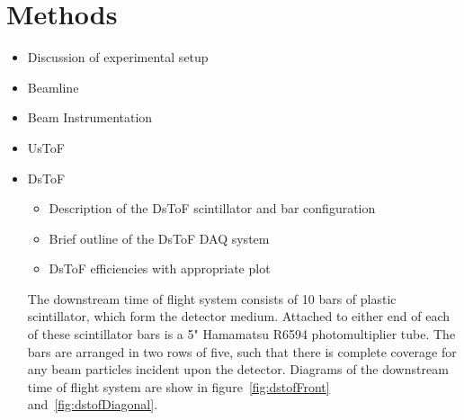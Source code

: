 \section{Methods}
\label{hptpcPaper:sec:Methods}
\begin{itemize}
    \item Discussion of experimental setup
\item Beamline
\item Beam Instrumentation
\item UsToF
\item DsToF
    \begin{itemize}
        \item Description of the DsToF scintillator and bar configuration 
        \item Brief outline of the DsToF DAQ system
        \item DsToF efficiencies with appropriate plot
    \end{itemize}
    The downstream time of flight system consists of 10 bars of plastic scintillator, which form the detector medium. Attached to either end of each of these scintillator bars is a 5" Hamamatsu R6594 photomultiplier tube. The bars are arranged in two rows of five, such that there is complete coverage for any beam particles incident upon the detector. Diagrams of the downstream time of flight system are show in figure~\ref{fig:dstofFront} and~\ref{fig:dstofDiagonal}.


\end{itemize}
